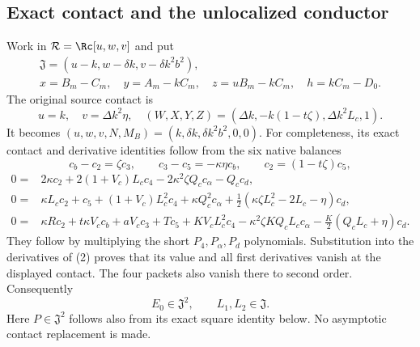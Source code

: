 \subsection{Exact contact and the unlocalized conductor}

Work in $\mathcal R=\Rc[u,w,v]$ and put
\[
 \begin{gathered}
 \mathfrak J=(u-k,w-\delta k,v-\delta k^2b^2),\\
 x=B_m-C_m,\quad y=A_m-kC_m,\quad z=uB_m-kC_m,
 \quad h=kC_m-D_0.
 \end{gathered}
\]
The original source contact is
\[
 u=k,\quad v=\Delta k^2\eta,\quad
 (W,X,Y,Z)=(\Delta k,-k(1-t\zeta),\Delta k^2L_c,1).
\]
It becomes $(u,w,v,N,M_B)=(k,\delta k,\delta k^2b^2,0,0)$.
For completeness, its exact contact and derivative identities follow
from the six native balances
\[
 c_b-c_2=\zeta c_3,\qquad c_3-c_5=-\kappa\eta c_b,
 \qquad c_2=(1-t\zeta)c_5,
\]
\begin{align*}
 0={}&2\kappa c_2+2(1+V_c)L_cc_4
         -2\kappa^2\zeta Q_cc_\alpha-Q_cc_d,\\
 0={}&\kappa L_cc_2+c_5+(1+V_c)L_c^2c_4+\kappa Q_c^2c_\alpha
         +\tfrac12(\kappa\zeta L_c^2-2L_c-\eta)c_d,\\
 0={}&\kappa Rc_2+t\kappa V_cc_b+aV_cc_3+Tc_5
       +KV_cL_c^2c_4-\kappa^2\zeta KQ_cL_cc_\alpha
       -\tfrac K2(Q_cL_c+\eta)c_d.
\end{align*}
They follow by multiplying the short $P_4,P_\alpha,P_d$ polynomials.
Substitution into the derivatives of (2) proves that its value and all
first derivatives vanish at the displayed contact. The four packets
also vanish there to second order. Consequently
\[
 E_0\in\mathfrak J^2,\qquad L_1,L_2\in\mathfrak J.       \tag{8}
\]
Here $P\in\mathfrak J^2$ follows also from its exact square identity
below. No asymptotic contact replacement is made.

